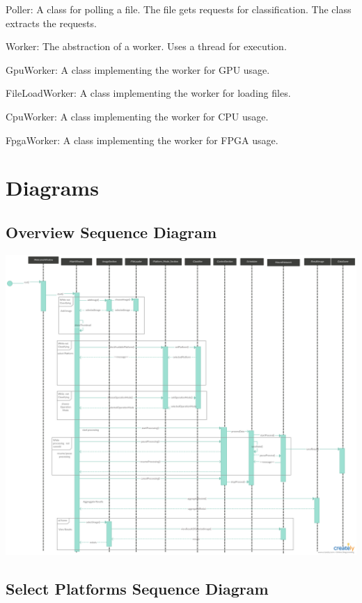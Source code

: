 \documentclass[parskip=full]{scrartcl}
\begin{document}
Poller: A class for polling a file. The file gets requests for classification. The class extracts the requests.

Worker: The abstraction of a worker. Uses a thread for execution.

GpuWorker: A class implementing the worker for GPU usage.

FileLoadWorker: A class implementing the worker for loading files.

CpuWorker: A class implementing the worker for CPU usage.

FpgaWorker: A class implementing the worker for FPGA usage.



\pagebreak

\section {Diagrams}

\subsection {Overview Sequence Diagram}

\begin{center}
\includegraphics[width=1.0\textwidth]{seq.png}
\end{center}

\pagebreak

\subsection {Select Platforms Sequence Diagram}
\end{document}

